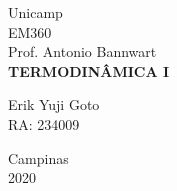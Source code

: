 \documentclass[a4paper, 12pt]{article}
\begin{document}
\begin{titlepage} %
	\begin{center} %
		{\large Unicamp}\\[0.2cm] %
		{\large EM360}\\[0.2cm] %
		{\large Prof. Antonio Bannwart}\\[3.2cm]
		{\bf \huge TERMODINÂMICA I}\\[5.1cm] %
	\end{center} %
	{\large Erik Yuji Goto}\\[0.5cm] %
	{\large RA: 234009}\\[10cm]
	\begin{center}
		{\large Campinas}\\[0.2cm]
		{\large 2020}
	\end{center}
\end{titlepage} %

\tableofcontents
\newpage
\end{document}
